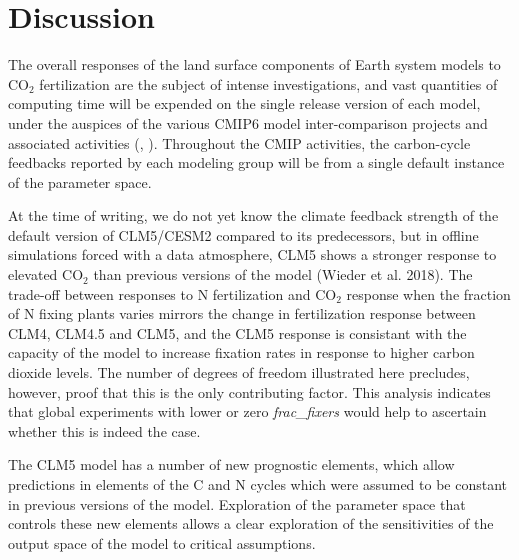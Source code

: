 \documentclass[draft,linenumbers]{agujournal}
\begin{document}
\section{Discussion}

The overall responses of the land surface components of Earth system models to CO$_{2}$ fertilization are the subject of intense investigations, and vast quantities of computing time will be expended on the single release version of each model, under the auspices of the various CMIP6 model inter-comparison projects and associated activities (\cite{meehl2014}, \cite{eyring2016}). Throughout the CMIP activities, the carbon-cycle feedbacks reported by each modeling group will be from a single default instance of the parameter space.

At the time of writing, we do not yet know the climate feedback strength of the default version of CLM5/CESM2 compared to its predecessors, but in offline simulations forced with a data atmosphere, CLM5 shows a stronger response to elevated CO$_{2}$ than previous versions of the model (Wieder et al. 2018).  The trade-off between responses to N fertilization and CO$_{2}$ response when the fraction of N fixing plants varies mirrors the change in fertilization response between CLM4, CLM4.5 and CLM5, and the CLM5 response is consistant with the capacity of the model to increase fixation rates in response to higher carbon dioxide levels. The number of degrees of freedom illustrated here precludes, however, proof that this is the only contributing factor. This analysis indicates that global experiments with lower or zero \emph{frac\_fixers} would help to ascertain whether this is indeed the case.

The CLM5 model has a number of new prognostic elements, which allow predictions in elements of the C and N cycles which were assumed to be constant in previous versions of the model. Exploration of the parameter space that controls these new elements allows a clear exploration of the sensitivities of the output space of the model to critical assumptions. 
\end{document}
